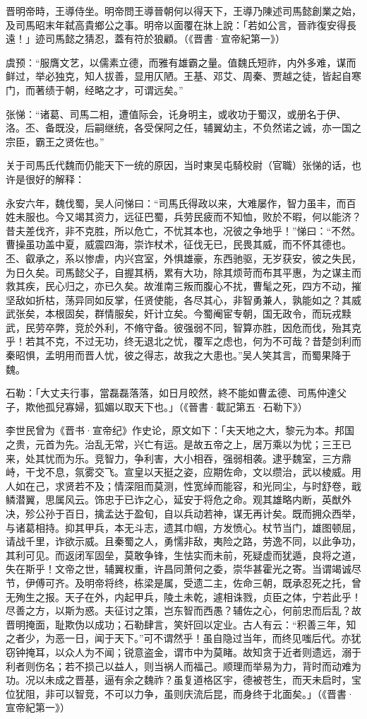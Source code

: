 晋明帝時，王導侍坐。明帝問王導晉朝何以得天下，王導乃陳述司馬懿創業之始，及司馬昭末年弑高貴鄉公之事。明帝以面覆在牀上說：「若如公言，晉祚復安得長遠！」迹司馬懿之猜忍，蓋有符於狼顧。（《晋書·宣帝紀第一》）

虞预：“服膺文艺，以儒素立德，而雅有雄霸之量。值魏氏短祚，内外多难，谋而鲜过，举必独克，知人拔善，显用仄陋。王基、邓艾、周秦、贾越之徒，皆起自寒门，而著绩于朝，经略之才，可谓远矣。”

张悌：“诸葛、司馬二相，遭值际会，讬身明主，或收功于蜀汉，或册名于伊、洛。丕、备既没，后嗣继统，各受保阿之任，辅翼幼主，不负然诺之诚，亦一国之宗臣，霸王之贤佐也。”

关于司馬氏代魏而仍能天下一统的原因，当时東吴屯騎校尉（官職）张悌的话，也许是很好的解释：

永安六年，魏伐蜀，吴人问悌曰：“司馬氏得政以来，大难屡作，智力虽丰，而百姓未服也。今又竭其资力，远征巴蜀，兵劳民疲而不知恤，败於不暇，何以能济？昔夫差伐齐，非不克胜，所以危亡，不忧其本也，况彼之争地乎！”悌曰：“不然。曹操虽功盖中夏，威震四海，崇诈杖术，征伐无已，民畏其威，而不怀其德也。丕、叡承之，系以惨虐，内兴宫室，外惧雄豪，东西驰驱，无岁获安，彼之失民，为日久矣。司馬懿父子，自握其柄，累有大功，除其烦苛而布其平惠，为之谋主而救其疾，民心归之，亦已久矣。故淮南三叛而腹心不扰，曹髦之死，四方不动，摧坚敌如折枯，荡异同如反掌，任贤使能，各尽其心，非智勇兼人，孰能如之？其威武张矣，本根固矣，群情服矣，奸计立矣。今蜀阉宦专朝，国无政令，而玩戎黩武，民劳卒弊，竞於外利，不脩守备。彼强弱不同，智算亦胜，因危而伐，殆其克乎！若其不克，不过无功，终无退北之忧，覆军之虑也，何为不可哉？昔楚剑利而秦昭惧，孟明用而晋人忧，彼之得志，故我之大患也。”吴人笑其言，而蜀果降于魏。

石勒：「大丈夫行事，當磊磊落落，如日月皎然，終不能如曹孟德、司馬仲達父子，欺他孤兒寡婦，狐媚以取天下也。」（《晉書·載記第五·石勒下》）

李世民曾为《晋书·宣帝纪》作史论，原文如下：「夫天地之大，黎元为本。邦国之贵，元首为先。治乱无常，兴亡有运。是故五帝之上，居万乘以为忧；三王已来，处其忧而为乐。竞智力，争利害，大小相吞，强弱相袭。逮乎魏室，三方鼎峙，干戈不息，氛雾交飞。宣皇以天挺之姿，应期佐命，文以缵治，武以棱威。用人如在己，求贤若不及；情深阻而莫测，性宽绰而能容，和光同尘，与时舒卷，戢鳞潜翼，思属风云。饰忠于已诈之心，延安于将危之命。观其雄略内断，英猷外决，殄公孙于百日，擒孟达于盈旬，自以兵动若神，谋无再计矣。既而拥众西举，与诸葛相持。抑其甲兵，本无斗志，遗其巾帼，方发愤心。杖节当门，雄图顿屈，请战千里，诈欲示威。且秦蜀之人，勇懦非敌，夷险之路，劳逸不同，以此争功，其利可见。而返闭军固垒，莫敢争锋，生怯实而未前，死疑虚而犹遁，良将之道，失在斯乎！文帝之世，辅翼权重，许昌同萧何之委，崇华甚霍光之寄。当谓竭诚尽节，伊傅可齐。及明帝将终，栋梁是属，受遗二主，佐命三朝，既承忍死之托，曾无殉生之报。天子在外，内起甲兵，陵土未乾，遽相诛戮，贞臣之体，宁若此乎！尽善之方，以斯为惑。夫征讨之策，岂东智而西愚？辅佐之心，何前忠而后乱？故晋明掩面，耻欺伪以成功；石勒肆言，笑奸回以定业。古人有云：“积善三年，知之者少，为恶一日，闻于天下。”可不谓然乎！虽自隐过当年，而终见嗤后代。亦犹窃钟掩耳，以众人为不闻；锐意盗金，谓市中为莫睹。故知贪于近者则遗远，溺于利者则伤名；若不损己以益人，则当祸人而福己。顺理而举易为力，背时而动难为功。况以未成之晋基，逼有余之魏祚？虽复道格区宇，德被苍生，而天未启时，宝位犹阻，非可以智竞，不可以力争，虽则庆流后昆，而身终于北面矣。」（《晋書·宣帝紀第一》）

